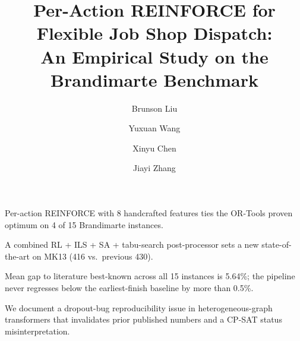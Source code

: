 \documentclass[preprint,review,3p,times,twocolumn]{elsarticle}
\begin{document}
\title{Per-Action REINFORCE for Flexible Job Shop Dispatch: \\
An Empirical Study on the Brandimarte Benchmark}

\author[brunson]{Brunson Liu}
\author[brunson]{Yuxuan Wang}
\author[brunson]{Xinyu Chen}
\author[brunson]{Jiayi Zhang}



\begin{highlights}
\item Per-action REINFORCE with 8 handcrafted features ties
the OR-Tools proven optimum on 4 of 15 Brandimarte instances.
\item A combined RL + ILS + SA + tabu-search post-processor
sets a new state-of-the-art on MK13 (416 vs.\ previous 430).
\item Mean gap to literature best-known across all 15
instances is 5.64\%; the pipeline never regresses below the
earliest-finish baseline by more than 0.5\%.
\item We document a dropout-bug reproducibility issue in
heterogeneous-graph transformers that invalidates prior
published numbers and a CP-SAT status misinterpretation.
\end{highlights}
\end{document}
